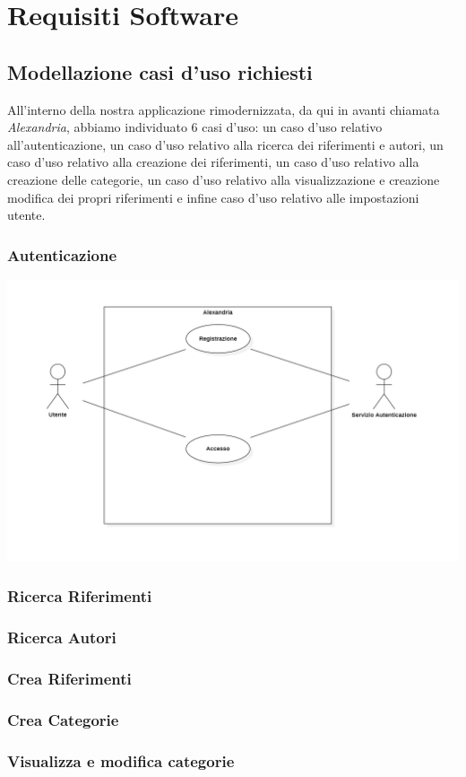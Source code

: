\chapter{Requisiti Software}
\raggedright{\section{Modellazione casi d'uso richiesti}}
All'interno della nostra applicazione rimodernizzata, da qui in avanti chiamata \textit{Alexandria}, abbiamo individuato 6 casi d'uso: un caso d'uso relativo all'autenticazione, un caso d'uso relativo alla ricerca dei riferimenti e autori, un caso d'uso relativo alla creazione dei riferimenti, un caso d'uso relativo alla creazione delle categorie, un caso d'uso relativo alla visualizzazione e creazione modifica dei propri riferimenti e infine caso d'uso relativo alle impostazioni utente.
\raggedright{\subsection{Autenticazione}}
         \begin{center}
     \hspace{-1cm}
            \includegraphics[width=.90\textwidth]{Immagini/Alexandria/useCaseLogin.png} 
        \end{center}
\raggedright{\subsection{Ricerca Riferimenti}}
\raggedright{\subsection{Ricerca Autori}}
\raggedright{\subsection{Crea Riferimenti}}
\raggedright{\subsection{Crea Categorie}}
\raggedright{\subsection{Visualizza e modifica categorie}}


